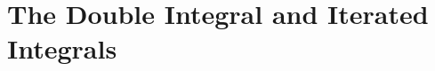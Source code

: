 \documentclass[a4paper, 11pt]{article}
\begin{document}
\maketitle
\thispagestyle{firstpage}

\setcounter{section}{9}
\setcounter{question}{90}

\section{The Double Integral and Iterated Integrals}

\end{document}

